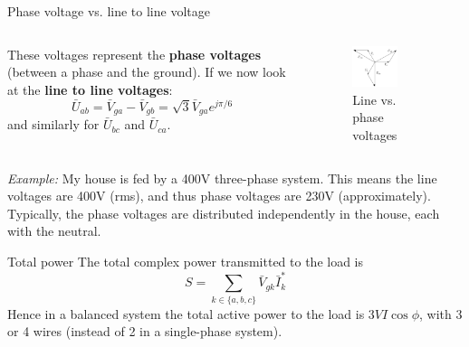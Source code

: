 \begin{frame}{Phase voltage vs. line to line voltage}

    \begin{columns}
    \begin{column}{0.5\textwidth}
        These voltages represent the \textbf{phase voltages} (between a phase and the ground). If we now look at the \textbf{line to line voltages}:
        $$
        \bar{U}_{ab} = \bar{V}_{ga} - \bar{V}_{gb} = \sqrt{3} \bar{V}_{ga} e^{j\pi / 6}
        $$
        and similarly for $\bar{U}_{bc}$ and $\bar{U}_{ca}$.
    \end{column}
    \begin{column}{0.5\textwidth}
        \begin{figure}
        \centering
        \includegraphics[width=0.6\textwidth]{images/line_vs_phase_voltage_diagram.png}
        \caption{Line vs. phase voltages}
        \end{figure}
    \end{column}
\end{columns}

\textit{Example:} My house is fed by a 400V three-phase system. This means the line voltages are 400V (rms), and thus phase voltages are 230V (approximately). Typically, the phase voltages are distributed independently in the house, each with the neutral.

\end{frame}

\begin{frame}{Total power}
    The total complex power transmitted to the load is
    $$
    S = \sum_{k \in \{a, b, c\}} \bar{V}_{gk} \bar{I}^*_{k}
    $$
    Hence in a balanced system the total active power to the load is $3VI \cos \phi$, with 3 or 4 wires (instead of 2 in a single-phase system).
\end{frame}


